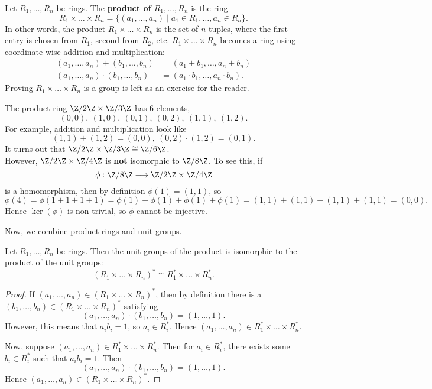 \documentclass[math1530-lecture-notes]{subfiles}
\begin{document}
\begin{definition}{}
  Let $R_1,\ldots,R_n$ be rings. The \textbf{product of $R_1,\ldots,R_n$} is the ring \[
    R_1\times \ldots\times R_n = \{(a_1,\ldots,a_n)\mid a_1\in R_1,\ldots,a_n\in R_n \} 
  .\] In other words, the product $R_1\times \ldots\times R_n$ is the set of $n$-tuples, where the
  first entry is chosen from $R_1$, second from $R_2$, etc. $R_1\times \ldots\times R_n$ becomes a
  ring using coordinate-wise addition and multiplication:
  \begin{align*}
    (a_1,\ldots,a_n)+(b_1,\ldots,b_n) &= (a_1+b_1,\ldots,a_n+b_n)\\
    (a_1,\ldots,a_n)\cdot (b_1,\ldots,b_n) &= (a_1\cdot b_1,\ldots,a_n\cdot b_n)
  .\end{align*} Proving $ R_1\times \ldots\times R_n$ is a group is left as an exercise for the
  reader.
\end{definition}

\begin{example}
  The product ring $\Z/ 2\Z \times  \Z / 3\Z$ has $6$ elements, \[
    (0,0),\ (1,0),\ (0,1),\ (0,2),\ (1,1),\ (1,2)
  .\] For example, addition and multiplication look like \[
    (1,1)+(1,2)=(0,0),\ (0,2)\cdot (1,2)=(0,1)
  .\] It turns out that $\Z / 2\Z \times  \Z / 3\Z \cong \Z / 6\Z$.\\

  However, $\Z / 2\Z\times \Z / 4\Z$ is \textbf{not} isomorphic to $\Z / 8\Z$. To see this, if \[
    \phi: \Z / 8\Z \longrightarrow \Z / 2\Z \times  \Z / 4\Z
  \] is a homomorphism, then by definition $\phi(1)=(1,1)$, so \[
  \phi(4)=\phi(1+1+1+1) = \phi(1)+\phi(1)+\phi(1)+\phi(1) = (1,1) + (1,1)+(1,1)+(1,1)=(0,0)
  .\] Hence $\ker(\phi)$ is non-trivial, so $\phi$ cannot be injective.
\end{example}

Now, we combine product rings and unit groups.
\begin{proposition}[]{}
  Let $R_1,\ldots,R_n$ be rings. Then the unit groups of the product is isomorphic to the product of
  the unit groups: \[
    \left( R_1\times \ldots\times R_n \right)^* \cong R_1^*\times \ldots\times R_n^*
  .\] 
\end{proposition}
\begin{proof}[Proof]
  If $(a_1,\ldots,a_n)\in \left( R_1\times \ldots\times R_n \right)^*$, then by definition there is
  a $(b_1,\ldots,b_n)\in \left( R_1\times \ldots\times R_n \right)^{*}$ satisfying \[
    (a_1,\ldots,a_n)\cdot (b_1,\ldots,b_n)=(1,\ldots,1)
  .\] However, this means that $a_ib_i=1$, so $a_i \in R_i^*$. Hence $(a_1,\ldots,a_n)\in
  R_1^{*}\times \ldots\times R_n^{*}$.

  Now, suppose $(a_1,\ldots,a_n)\in R_1^{*}\times \ldots\times R_n^{*}$. Then for $a_i\in R_i^{*}$,
  there exists some $b_i\in R_i^{*}$ such that $a_ib_i=1$. Then \[
    (a_1,\ldots,a_n)\cdot (b_1,\ldots,b_n)=(1,\ldots,1)
  .\] Hence $(a_1,\ldots,a_n)\in \left( R_1\times \ldots\times R_n \right)^*$.
\end{proof}
\end{document}

